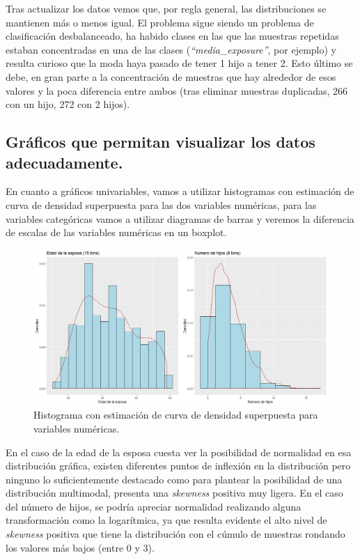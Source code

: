 \documentclass[a4paper,12pt, oneside]{book}
\begin{document}
Tras actualizar los datos vemos que, por regla general, las distribuciones se mantienen más o menos igual. El problema sigue siendo un problema de clasificación desbalanceado, ha habido clases en las que las muestras repetidas estaban concentradas en una de las clases (\textit{``media\_exposure''}, por ejemplo) y resulta curioso que la moda haya pasado de tener 1 hijo a tener 2. Esto último se debe, en gran parte a la concentración	de muestras que hay alrededor de esos valores y la poca diferencia entre ambos (tras eliminar muestras duplicadas, 266 con un hijo, 272 con 2 hijos).\\

\subsection{Gráficos que permitan visualizar los datos adecuadamente.}
En cuanto a gráficos univariables, vamos a utilizar histogramas con estimación de curva de densidad superpuesta para las dos variables numéricas, para las variables categóricas vamos a utilizar diagramas de barras y veremos la diferencia de escalas de las variables numéricas en un boxplot.
\begin{figure}[H]
\includegraphics[scale=0.5]{images/contraceptive_histogram.png}
\caption{Histograma con estimación de curva de densidad superpuesta para variables numéricas.}
\end{figure}

En el caso de la edad de la esposa cuesta ver la posibilidad de normalidad en esa distribución gráfica, existen diferentes puntos de inflexión en la distribución pero ninguno lo suficientemente destacado como para plantear la posibilidad de una distribución multimodal, presenta una \textit{skewness} positiva muy ligera. En el caso del número de hijos, se podría apreciar normalidad realizando alguna transformación como la logarítmica, ya que resulta evidente el alto nivel de \textit{skewness} positiva que tiene la distribución con el cúmulo de muestras rondando los valores más bajos (entre 0 y 3). \\
\end{document}
